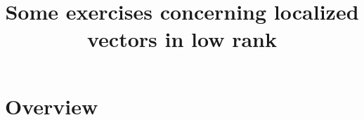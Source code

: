 \documentclass[reqno]{amsart} 
\title{Some exercises concerning localized vectors in low rank}
\numberwithin{equation}{section}
\numberwithin{theorem}{section}
\begin{document}
\maketitle
\tableofcontents



\section{Overview}\label{sec:d1a9162ede03}






{} 
\end{document}
